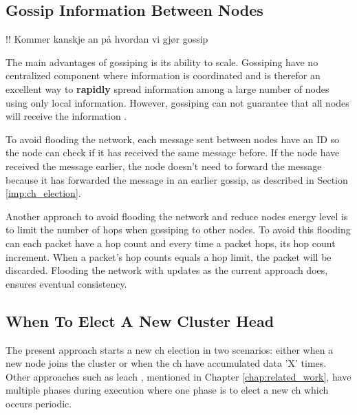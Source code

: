 \documentclass[USenglish]{uit-thesis}
\begin{document}


\subsection{Gossip Information Between Nodes}
!! Kommer kanskje an på hvordan vi gjør gossip


The main advantages of gossiping is its ability to scale. Gossiping have no centralized component where information is coordinated and is therefor an excellent way to \textbf{rapidly} spread information among a large number of nodes using only local information. However, gossiping can not guarantee that all nodes will receive the information \cite{demers}.

To avoid flooding the network, each message sent between nodes have an ID so the node can check if it has received the same message before. If the node have received the message earlier, the node doesn't need to forward the message because it has forwarded the message in an earlier gossip, as described in Section \ref{imp:ch_election}.

Another approach to avoid flooding the network and reduce nodes energy level is to limit the number of hops when gossiping to other nodes. To avoid this flooding can each packet have a hop count and every time a packet hops, its hop count increment. When a packet's hop counts equals a hop limit, the packet will be discarded. Flooding the network with updates as the current approach does, ensures eventual consistency.
 
 
\subsection{When To Elect A New Cluster Head}
The present approach starts a new \gls{ch} election in two scenarios: either when a new node joins the cluster or when the \gls{ch} have accumulated data 'X' times.
Other approaches such as \gls{leach} \cite{leach}, mentioned in Chapter \ref{chap:related_work}, have multiple phases during execution where one phase is to elect a new \gls{ch} which occurs periodic.
\end{document}
